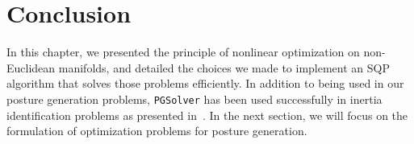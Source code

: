 \section{Conclusion}
\label{sec:conclusion}

In this chapter, we presented the principle of nonlinear optimization on non-Euclidean manifolds, and detailed the choices we made to implement an SQP algorithm that solves those problems efficiently.
In addition to being used in our posture generation problems, {\tt PGSolver} has been used successfully in inertia identification problems as presented in~\cite{traversaro:iros:2016}.
In the next section, we will focus on the formulation of optimization problems for posture generation.


